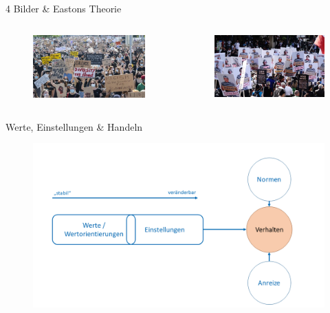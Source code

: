 \documentclass[11pt]{beamer}
\begin{document}
\begin{frame}[t]{4 Bilder \& Eastons Theorie}
\begin{columns}
\begin{column}{0.25\textwidth}
			\begin{figure}[ht]
				\includegraphics[width=\textwidth]{pics/s2-3.jpg}
			\end{figure}
		\end{column}
		\begin{column}{0.25\textwidth}
			\begin{figure}[ht]
				\includegraphics[width=\textwidth]{pics/s2-4.jpg}
			\end{figure}
		\end{column}
	\end{columns}
\end{frame}

\begin{frame}{Werte, Einstellungen \& Handeln}
	\begin{center}
		\begin{figure}[ht]
			\includegraphics[width=\textwidth]{pics/s2-5.png}
		\end{figure}
	\end{center}
\end{frame}
\end{document}
